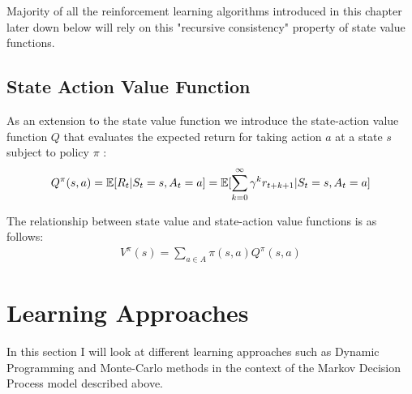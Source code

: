 Majority of all the reinforcement learning algorithms introduced in this chapter later down below will rely on this "recursive consistency" \cite{lecture_mdp} property of state value functions. 


\subsection{State Action Value Function}
As an extension to the state value function we introduce the state-action value function $Q$ that evaluates the expected return for taking action $a$ at a state $s$ subject to policy $\pi$ \cite{lecture_mdp} :
\begin{align}
    Q^{\pi}(s, a) = \operatorname{\mathbb{E}}[R_t | S_t = s, A_t = a] = \operatorname{\mathbb{E}}[\sum^{\infty}_{k=0} \gamma^k r_{t+k+1} | S_t = s, A_t = a]
\end{align}

The relationship between state value and state-action value functions is as follows:
\begin{align}
    V^{\pi}(s) = \sum_{a \in A} \pi(s, a) Q^{\pi}(s, a) 
\end{align}


\section{Learning Approaches}

In this section I will look at different learning approaches
such as Dynamic Programming and Monte-Carlo methods in the
context of the Markov Decision Process model described above. 

